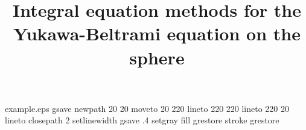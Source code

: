 %
%
%
%
%
\begin{filecontents*}{example.eps}
gsave
newpath
  20 20 moveto
  20 220 lineto
  220 220 lineto
  220 20 lineto
closepath
2 setlinewidth
gsave
  .4 setgray fill
grestore
stroke
grestore
\end{filecontents*}
%
\RequirePackage{fix-cm}
%
\documentclass[smallextended]{svjour3}       %
%
\smartqed  %
%
\usepackage{graphicx}
%
%
\usepackage{geometry,enumerate,datetime}                
\usepackage{graphicx}
\usepackage{amssymb,amsmath}
\usepackage{epstopdf}
\usepackage{array}
\usepackage{subfigure}
\usepackage{tensor,color}
\usepackage{tikz,pgfplots}
%
\newcommand{\todo}[1]{ \fbox{{\bf TODO:} \color{red} #1}}
\newcommand{\lap}{\bigtriangleup}
\newcommand{\C}{C_k}
\renewcommand{\S} {\mathcal{S}}
\newcommand{\bigO} {\mathcal{O}}
\newcommand{\p}{\partial}
\newcommand{\e}{\varepsilon}
\newcommand{\s}{\ss}
\newcommand{\R}{I \! \! R^3}
\renewcommand{\H}{\mathcal{H}}
\newcommand{\pderiv}[2]{\frac{\partial #1}{\partial #2}}
%
%



\title{Integral equation methods for the Yukawa-Beltrami equation on
the sphere 
}


